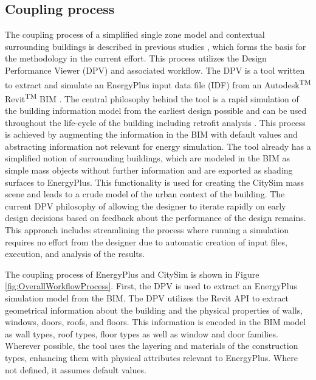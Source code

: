 \documentclass{tBPS2e}
\theoremstyle{plain}
\theoremstyle{definition}
\theoremstyle{remark}
\newcommand{\noteDT}[1]{\footnote{\textcolor{green}{#1}}}
\begin{document}
\subsection{Coupling process} 
The coupling process of a simplified single zone
model and contextual surrounding buildings is described in previous studies
\citep{thomas2014multiscale}, which forms the basis for the methodology
in the current effort. This process utilizes the Design Performance Viewer
(DPV) and associated workflow. The DPV is a tool written to extract and
simulate an EnergyPlus input data file (IDF) from an
Autodesk\textsuperscript{TM} Revit\textsuperscript{TM} BIM
\citep{Schlueter2009}. The central philosophy behind the tool is a rapid simulation
of the building information model from the earliest design possible and can be
used throughout the life-cycle of the building including retrofit analysis
\citep{Miller:2014tu}. This process is achieved by augmenting the information
in the BIM with default values and abstracting information not relevant for
energy simulation. The tool already has a simplified notion of surrounding
buildings, which are modeled in the BIM as simple mass objects without further
information and are exported as shading surfaces to EnergyPlus. This
functionality is used for creating the CitySim mass scene and leads to a crude
model of the urban context of the building. The current DPV philosophy of
allowing the designer to iterate rapidly on early design decisions based on
feedback about the performance of the design remains. This approach includes
streamlining the process where running a simulation requires no effort from
the designer due to automatic creation of input files, execution, and analysis
of the results.%

The coupling process of EnergyPlus and CitySim is shown in Figure
\ref{fig:OverallWorkflowProcess}. First, the DPV is used to extract an
EnergyPlus simulation model from the BIM. The DPV utilizes the Revit API to
extract geometrical information about the building and the physical properties
of walls, windows, doors, roofs, and floors. This information is encoded in the
BIM model as wall types, roof types, floor types as well as window and door
families. Wherever possible, the tool uses the layering and materials of the
construction types, enhancing them with physical attributes relevant to
EnergyPlus. Where not defined, it assumes default values.
\end{document}
